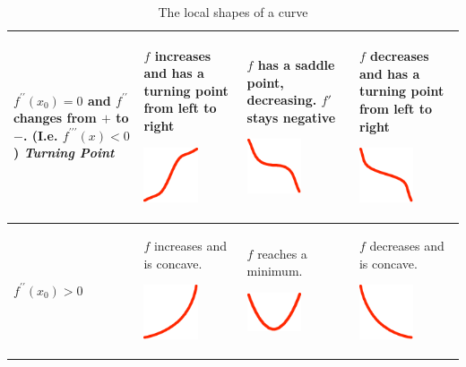 \begin{table}
{\begin{center}
\begin{tabular}{p{17mm}|p{25mm}|p{25mm}|p{25mm}}
\hline
\begin{raggedright}%
$f^{\prime\prime}(x_0)=0$
{\footnotesize
and $f^{\prime\prime}$ changes from $+$ to $-$. (I.e.
$f^{\prime\prime\prime}(x)<0$)}
{\em Turning Point}
\end{raggedright}&
\begin{raggedright}
$f$ increases and has a turning point
from left to right
\centerline{\includegraphics[width=16mm]{pic/CUR.png}}
\end{raggedright}&%
\begin{raggedright}
$f$ has a saddle point, decreasing.
$f'$ stays negative
\centerline{\includegraphics[width=16mm]{pic/CSD.png}}
\end{raggedright}&%
\begin{raggedright}
$f$ decreases and has a turning point
from left to right
\centerline{\includegraphics[width=16mm]{pic/CDR.png}}
\end{raggedright}\\

\hline
$f^{\prime\prime}(x_0)>0$&
\begin{raggedright}
$f$ increases and is concave.
\centerline{\includegraphics[width=16mm]{pic/CBR.png}}
\end{raggedright}&%
\begin{raggedright}
$f$ reaches a minimum.
\centerline{\includegraphics[width=16mm]{pic/CMI.png}}
\end{raggedright}&%
\begin{raggedright}
$f$ decreases and is concave.
\centerline{\includegraphics[width=16mm]{pic/CBL.png}}
\end{raggedright}
\\

\end{tabular}
\end{center}
}
\caption{The local shapes of a curve}
\label{tabkurdi}
\end{table}

